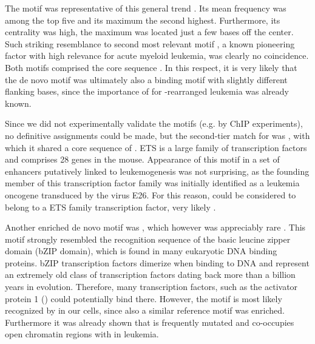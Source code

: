 The motif \motifx was representative of this general trend . Its mean frequency was among the top five and its maximum the second highest. Furthermore, its centrality was high, the maximum was located just a few bases off the center. Such striking resemblance to second most relevant motif \motifpuone, a known pioneering factor with high relevance for acute myeloid leukemia\cite{Rosenbauer2004,Rosenbauer2006}, was clearly no coincidence. Both motifs comprised the core sequence . In this respect, it is very likely that the de novo motif was ultimately also a  binding motif with slightly different flanking bases, since the importance of  for -rearranged leukemia was already known\cite{Aikawa2015}.

Since we did not experimentally validate the motifs (e.g. by ChIP experiments), no definitive assignments could be made, but the second-tier match for \motifx was \motifetsone {}, with which it shared a core sequence of . ETS is a large family of transcription factors\cite{Sharrocks2001} and comprises \num{28} genes in the mouse. Appearance of this motif in a set of enhancers putatively linked to leukemogenesis was not surprising, as the founding member of this transcription factor family was initially identified as a leukemia oncogene transduced by the virus E26\cite{Leprince1983}. For this reason, \motifx could be considered to belong to a ETS family transcription factor, very likely .

Another enriched de novo motif was \motifxb, which however was appreciably rare . This motif strongly resembled the recognition sequence  of the basic leucine zipper domain (bZIP domain), which is found in many eukaryotic DNA binding proteins. bZIP transcription factors dimerize when binding to DNA and represent an extremely old class of transcription factors dating back more than a billion years in evolution\cite{Amoutzias2007}. Therefore, many transcription factors, such as the activator protein 1 () could potentially bind there\cite{Chaudhari2018}. However, the motif is most likely recognized by  in our cells, since also a similar reference motif \motifcebpb was enriched. Furthermore it was already shown that \tfcebpa is frequently mutated\cite{Braun2019} and co-occupies open chromatin regions with  in \mllafnine leukemia\cite{Cusan2018}. 

